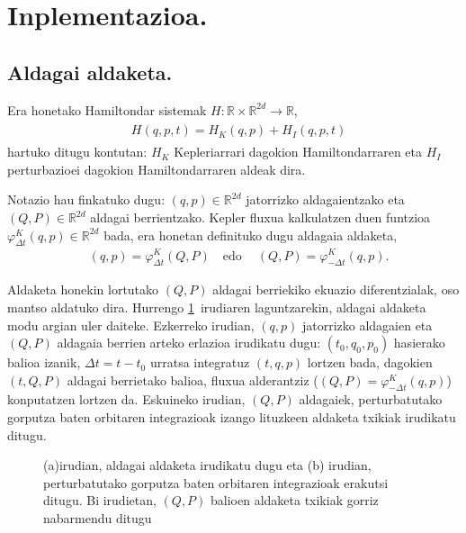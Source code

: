 \section{Inplementazioa.}


\subsection*{Aldagai aldaketa.}
Era honetako Hamiltondar sistemak $H: \mathbb{R} \times \mathbb{R}^{2d} \longrightarrow \mathbb{R}$, 
\begin{align}
\begin{split}
&H(q,p,t)=H_K(q,p)+H_I(q,p,t)
\end{split}
\end{align} 
hartuko ditugu kontutan: $H_K$  Kepleriarrari dagokion Hamiltondarraren  eta $H_I$ perturbazioei dagokion Hamiltondarraren aldeak dira.  

Notazio hau finkatuko dugu: $(q,p) \in \mathbb{R}^{2d}$ jatorrizko aldagaientzako eta $(Q,P) \in \mathbb{R}^{2d}$ aldagai berrientzako.
Kepler fluxua kalkulatzen duen funtzioa $\varphi_{\Delta t}^K(q,p) \in \mathbb{R}^{2d}$ bada, era honetan definituko dugu aldagaia aldaketa,
\begin{align}
\label{eq:aldak}
&(q,p)=\varphi_{\Delta t}^K(Q,P) \quad \text{edo} \quad \ (Q,P)=\varphi_{-\Delta t}^K(q,p).
\end{align}

Aldaketa honekin lortutako $(Q,P)$ aldagai berriekiko ekuazio diferentzialak, oso mantso aldatuko dira. Hurrengo \ref{fig:Aldg}~irudiaren laguntzarekin, aldagai aldaketa modu argian uler daiteke. Ezkerreko irudian, $(q,p)$ jatorrizko aldagaien eta $(Q,P)$ aldagaia berrien arteko erlazioa irudikatu dugu: $(t_0,q_0,p_0)$ hasierako balioa izanik, $\Delta t=t-t_0$ urratsa integratuz  $(t,q,p)$ lortzen bada, dagokien $(t,Q,P)$ aldagai berrietako balioa, fluxua alderantziz ($(Q,P)=\varphi_{-\Delta t}^K(q,p)$) konputatzen lortzen da. Eskuineko irudian, $(Q,P)$ aldagaiek, perturbatutako gorputza baten orbitaren integrazioak izango lituzkeen aldaketa txikiak irudikatu ditugu. 


\begin{figure}[h!]
\centering
{}
\caption[Atalen hasieraketa.]
        {\small (a)irudian, aldagai aldaketa irudikatu dugu eta (b) irudian, perturbatutako gorputza baten orbitaren integrazioak erakutsi ditugu. Bi irudietan, $(Q,P)$ balioen aldaketa txikiak gorriz nabarmendu ditugu          
        }
\label{fig:Aldg}
\end{figure}   

